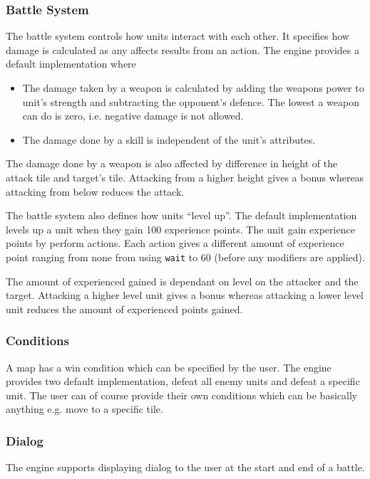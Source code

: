 \subsubsection{Battle System}
\label{ssub:battle_system}

The battle system controls how units interact with each other.  It specifies how damage is calculated as any affects results from an action. The engine provides a default implementation where 
\begin{itemize}
	\item The damage taken by a weapon is calculated by adding the weapons power to unit's strength and subtracting the opponent's defence. The lowest a weapon can do is zero, i.e. negative damage is not allowed.
	\item The damage done by a skill is independent of the unit's attributes.
\end{itemize}

The damage done by a weapon is also affected by difference in height of the attack tile and target's tile. Attacking from a higher height gives a bonus whereas attacking from below reduces the attack.


The battle system also defines how units ``level up''. The default implementation levels up a unit when they gain 100 experience points. The unit gain experience points by perform actions. Each action gives a different amount of experience point ranging from none from using \texttt{wait} to 60 (before any modifiers are applied).

The amount of experienced gained is dependant on level on the attacker and the target. Attacking a higher level unit gives a bonus whereas attacking a lower level unit reduces the amount of experienced points gained.

\subsubsection{Conditions}
\label{ssub:events}

A map has a win condition which can be specified by the user.  The engine provides two default implementation, defeat all enemy units and defeat a specific unit.  The user can of course provide their own conditions which can be basically anything e.g. move to a specific tile. 


\subsubsection{Dialog}
\label{ssub:dialog}
The engine supports displaying dialog to the user at the start and end of a battle. 

